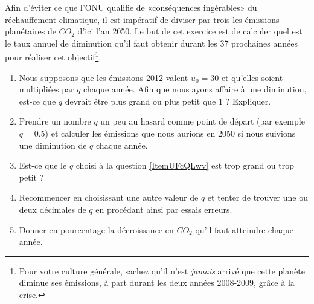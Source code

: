 
\begin{exercice}\label{exosmath-0304}

    Afin d'éviter ce que l'ONU qualifie de «conséquences ingérables» du réchauffement climatique, il est impératif de diviser par trois les émissions planétaires de \( CO_2\) d'ici l'an 2050\cite{KXZPUlP}. Le but de cet exercice est de calculer quel est le taux annuel de diminution qu'il faut obtenir durant les 37 prochaines années pour réaliser cet objectif\footnote{Pour votre culture générale, sachez qu'il n'est \emph{jamais} arrivé que cette planète diminue ses émissions, à part durant les deux années 2008-2009, grâce à la crise.}.

    \begin{enumerate}
        \item
            Nous supposons que les émissions 2012 valent \( u_0=\)\unit{30}{\giga\ton}\cite{XZZqclR} et qu'elles soient multipliées par \( q\) chaque année. Afin que nous ayons affaire à une diminution, est-ce que \( q\) devrait être plus grand ou plus petit que \( 1\) ? Expliquer.
        \item   \label{ItemUFcQLwv}
            Prendre un nombre \( q\) un peu au hasard comme point de départ (par exemple \( q=0.5\)) et calculer les émissions que nous aurions en 2050 si nous suivions une diminution de \( q\) chaque année.
        \item
            Est-ce que le \( q\) choisi à la question \ref{ItemUFcQLwv} est trop grand ou trop petit ?
        \item
            Recommencer en choisissant une autre valeur de \( q\) et tenter de trouver une ou deux décimales de \( q\) en procédant ainsi par essais erreurs.
        \item
            Donner en pourcentage la décroissance en \( CO_2\) qu'il faut atteindre chaque année.
    \end{enumerate}

\end{exercice}
